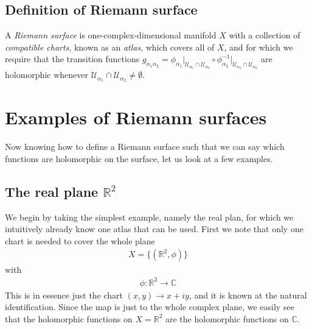 \documentclass[lettersize,12pt]{article}
\begin{document}
\subsection{Definition of Riemann surface}
A \textit{Riemann surface} is one-complex-dimensional manifold $X$ with a collection of \textit{compatible charts}, known as an \textit{atlas}, which covers all of $X$, and for which we require that the transition functions $g_{\alpha_1\alpha_2}=\phi_{\alpha_1}\big|_{\mathcal{U}_{\alpha_1}\cap \mathcal{U}_{\alpha_2}}\circ \phi_{\alpha_2}^{-1}\big|_{\mathcal{U}_{\alpha_1}\cap \mathcal{U}_{\alpha_2}}$ are holomorphic whenever $\mathcal{U}_{\alpha_1}\cap \mathcal{U}_{\alpha_2}\neq \emptyset$. \cite{Farkas}
\section{Examples of Riemann surfaces}
Now knowing how to define a Riemann surface such that we can say which functions are holomorphic on the surface, let us look at a few examples.
\subsection{The real plane $\mathds{R}^2$}
We begin by taking the simplest example, namely the real plan, for which we intuitively already know one atlas that can be used. First we note that only one chart is needed to cover the whole plane
\begin{equation}
	\begin{aligned}
		X=\{(\mathds{R}^2,\phi)\}
	\end{aligned}
\end{equation}
with
\begin{equation}
	\begin{aligned}
		\phi: \mathds{R}^2\to \mathds{C}
	\end{aligned}
\end{equation}
This is in essence just the chart $(x,y)\to x+iy$, and it is known at the natural identification. Since the map is just to the whole complex plane, we easily see that the holomorphic functions on $X=\mathds{R}^2$ are the holomorphic functions on $\mathds{C}$.
\end{document}
